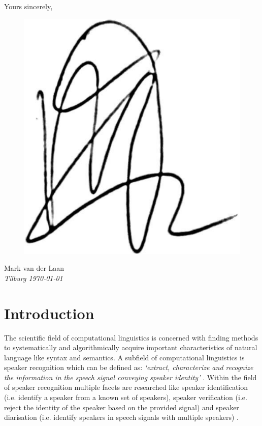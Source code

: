 \documentclass[a4paper, oneside]{book}
\begin{document}
Yours sincerely,
\begin{figure}[H]
\includegraphics[scale=0.1]{images/sign.png}
\end{figure}
Mark van der Laan \\
\textit{Tilburg \today}

\tableofcontents

\listoftables

\listoffigures

\chapter{Introduction}\label{chapter:introduction}

The scientific field of computational linguistics is concerned with finding methods to systematically and algorithmically acquire important characteristics of natural language like syntax and semantics. A subfield of computational linguistics is speaker recognition which can be defined as: \textit{‘extract, characterize and recognize the information in the speech signal conveying speaker identity’} \cite{reynolds2002overview}. Within the field of speaker recognition multiple facets are researched like speaker identification (i.e. identify a speaker from a known set of speakers), speaker verification (i.e. reject the identity of the speaker based on the provided signal) and speaker diarisation (i.e. identify speakers in speech signals with multiple speakers) \cite{reynolds2002overview} \cite{tranter2006overview}. \\
\end{document}
